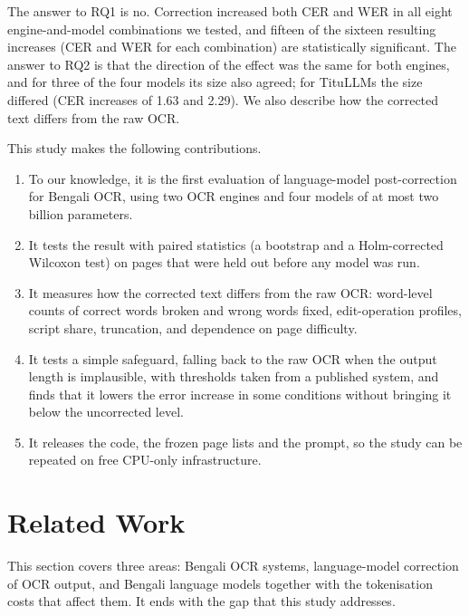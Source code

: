 \documentclass[conference]{IEEEtran}
\begin{document}
The answer to RQ1 is no. Correction increased both CER and WER in all eight engine-and-model combinations we tested, and fifteen of the sixteen resulting increases (CER and WER for each combination) are statistically significant. The answer to RQ2 is that the direction of the effect was the same for both engines, and for three of the four models its size also agreed; for TituLLMs the size differed (CER increases of 1.63 and 2.29). We also describe how the corrected text differs from the raw OCR.

This study makes the following contributions.
\begin{enumerate}
\item To our knowledge, it is the first evaluation of language-model post-correction for Bengali OCR, using two OCR engines and four models of at most two billion parameters.
\item It tests the result with paired statistics (a bootstrap and a Holm-corrected Wilcoxon test) on pages that were held out before any model was run.
\item It measures how the corrected text differs from the raw OCR: word-level counts of correct words broken and wrong words fixed, edit-operation profiles, script share, truncation, and dependence on page difficulty.
\item It tests a simple safeguard, falling back to the raw OCR when the output length is implausible, with thresholds taken from a published system, and finds that it lowers the error increase in some conditions without bringing it below the uncorrected level.
\item It releases the code, the frozen page lists and the prompt, so the study can be repeated on free CPU-only infrastructure.
\end{enumerate}

\section{Related Work}

This section covers three areas: Bengali OCR systems, language-model correction of OCR output, and Bengali language models together with the tokenisation costs that affect them. It ends with the gap that this study addresses.
\end{document}
